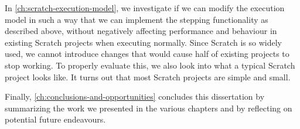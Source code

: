 \documentclass[main]{subfiles}
\begin{document}
In \cref{ch:scratch-execution-model}, we investigate if we can modify the execution model in such a way that we can implement the stepping functionality as described above, without negatively affecting performance and behaviour in existing Scratch projects when executing normally.
Since Scratch is so widely used, we cannot introduce changes that would cause half of existing projects to stop working.
To properly evaluate this, we also look into what a typical Scratch project looks like.
It turns out that most Scratch projects are simple and small.

Finally, \cref{ch:conclusions-and-opportunities} concludes this dissertation by summarizing the work we presented in the various chapters and by reflecting on potential future endeavours.
\end{document}
